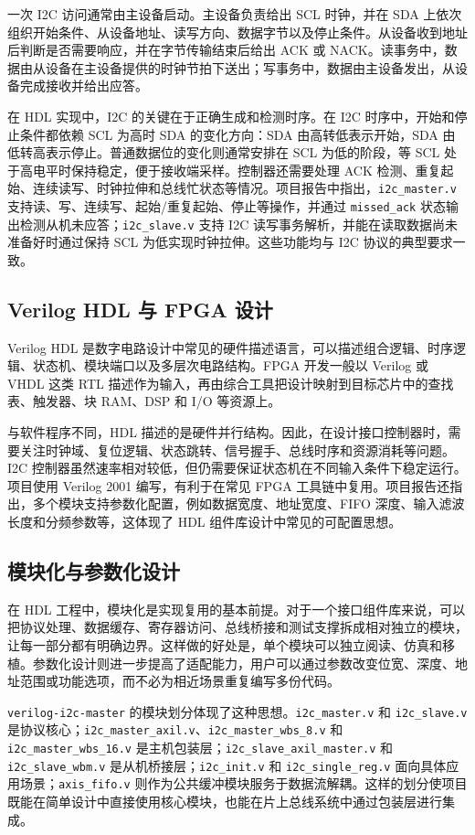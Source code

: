 \documentclass[12pt,a4paper]{article}
\numberwithin{equation}{section}
\begin{document}
一次 I2C 访问通常由主设备启动。主设备负责给出 SCL 时钟，并在 SDA 上依次组织开始条件、从设备地址、读写方向、数据字节以及停止条件。从设备收到地址后判断是否需要响应，并在字节传输结束后给出 ACK 或 NACK。读事务中，数据由从设备在主设备提供的时钟节拍下送出；写事务中，数据由主设备发出，从设备完成接收并给出应答。

在 HDL 实现中，I2C 的关键在于正确生成和检测时序。在 I2C 时序中，开始和停止条件都依赖 SCL 为高时 SDA 的变化方向：SDA 由高转低表示开始，SDA 由低转高表示停止。普通数据位的变化则通常安排在 SCL 为低的阶段，等 SCL 处于高电平时保持稳定，便于接收端采样。控制器还需要处理 ACK 检测、重复起始、连续读写、时钟拉伸和总线忙状态等情况。项目报告中指出，\texttt{i2c\_master.v} 支持读、写、连续写、起始/重复起始、停止等操作，并通过 \texttt{missed\_ack} 状态输出检测从机未应答；\texttt{i2c\_slave.v} 支持 I2C 读写事务解析，并能在读取数据尚未准备好时通过保持 SCL 为低实现时钟拉伸。这些功能均与 I2C 协议的典型要求一致。

\subsection{Verilog HDL 与 FPGA 设计}

Verilog HDL 是数字电路设计中常见的硬件描述语言，可以描述组合逻辑、时序逻辑、状态机、模块端口以及多层次电路结构。FPGA 开发一般以 Verilog 或 VHDL 这类 RTL 描述作为输入，再由综合工具把设计映射到目标芯片中的查找表、触发器、块 RAM、DSP 和 I/O 等资源上。

与软件程序不同，HDL 描述的是硬件并行结构。因此，在设计接口控制器时，需要关注时钟域、复位逻辑、状态跳转、信号握手、总线时序和资源消耗等问题。I2C 控制器虽然速率相对较低，但仍需要保证状态机在不同输入条件下稳定运行。项目使用 Verilog 2001 编写，有利于在常见 FPGA 工具链中复用。项目报告还指出，多个模块支持参数化配置，例如数据宽度、地址宽度、FIFO 深度、输入滤波长度和分频参数等，这体现了 HDL 组件库设计中常见的可配置思想。

\subsection{模块化与参数化设计}

在 HDL 工程中，模块化是实现复用的基本前提。对于一个接口组件库来说，可以把协议处理、数据缓存、寄存器访问、总线桥接和测试支撑拆成相对独立的模块，让每一部分都有明确边界。这样做的好处是，单个模块可以独立阅读、仿真和移植。参数化设计则进一步提高了适配能力，用户可以通过参数改变位宽、深度、地址范围或功能选项，而不必为相近场景重复编写多份代码。

\texttt{verilog-i2c-master} 的模块划分体现了这种思想。\texttt{i2c\_master.v} 和 \texttt{i2c\_slave.v} 是协议核心；\texttt{i2c\_master\_axil.v}、\texttt{i2c\_master\_wbs\_8.v} 和 \texttt{i2c\_master\_wbs\_16.v} 是主机包装层；\texttt{i2c\_slave\_axil\_master.v} 和 \texttt{i2c\_slave\_wbm.v} 是从机桥接层；\texttt{i2c\_init.v} 和 \texttt{i2c\_single\_reg.v} 面向具体应用场景；\texttt{axis\_fifo.v} 则作为公共缓冲模块服务于数据流解耦。这样的划分使项目既能在简单设计中直接使用核心模块，也能在片上总线系统中通过包装层进行集成。
\end{document}
